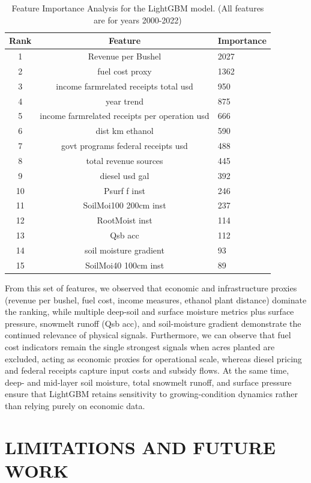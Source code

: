 \documentclass[10pt,twocolumn]{article}
\begin{document}
\begin{table}[htb]
\centering
\caption{Feature Importance Analysis for the LightGBM model. (All features are for years 2000-2022)}
\label{tab:feature_importance}
\small
\begin{tabular}{ccl}
\toprule
Rank & Feature & Importance \\
\midrule
1 & Revenue per Bushel & 2027 \\
2 & fuel cost proxy & 1362 \\
3 & income farmrelated receipts total usd & 950 \\
4 & year trend & 875 \\
5 & income farmrelated receipts per operation usd & 666 \\
6 & dist km ethanol & 590 \\
7 & govt programs federal receipts usd & 488 \\
8 & total revenue sources & 445 \\
9 & diesel usd gal & 392 \\
10 & Psurf f inst & 246 \\
11 & SoilMoi100 200cm inst & 237 \\
12 & RootMoist inst & 114 \\
13 & Qsb acc & 112 \\
14 & soil moisture gradient & 93 \\
15 & SoilMoi40 100cm inst & 89 \\
\bottomrule
\end{tabular}
\end{table}

From this set of features, we observed that economic and infrastructure proxies (revenue per bushel, fuel cost, income measures, ethanol plant distance) dominate the ranking, while multiple deep-soil and surface moisture metrics plus surface pressure, snowmelt runoff (Qsb acc), and soil-moisture gradient demonstrate the continued relevance of physical signals. Furthermore, we can observe that fuel cost indicators remain the single strongest signals when acres planted are excluded, acting as economic proxies for operational scale, whereas diesel pricing and federal receipts capture input costs and subsidy flows. At the same time, deep- and mid-layer soil moisture, total snowmelt runoff, and surface pressure ensure that LightGBM retains sensitivity to growing-condition dynamics rather than relying purely on economic data.

\section{LIMITATIONS AND FUTURE WORK}
\end{document}

